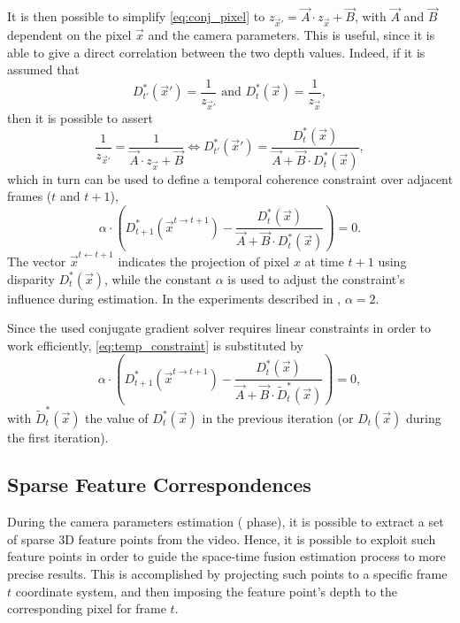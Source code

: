 {	It is then possible to simplify \cref{eq:conj_pixel} to 
	$z_{\vec x'} = \vec A\cdot z_{\vec x} + \vec B$,
	with $\vec A$ and $\vec B$ dependent on the pixel $\vec x$ and the camera parameters. This is useful, since it is able to give a direct correlation between the two depth values. 
	Indeed, if it is assumed that
	$$D^*_{t'}(\vec x') = \frac{1}{z_{\vec x'}}\text{ and }
	D^*_{t}(\vec x) = \frac{1}{z_{\vec x}},
	$$
	then it is possible to assert	
	\begin{equation*}
	\frac{1}{z_{\vec x'}} = \frac{1}{\vec A\cdot z_{\vec x} + \vec B} \iff
	D^*_{t'}(\vec x') = \frac{D^*_t(\vec x)}{\vec A + \vec B\cdot D^*_t(\vec x)},
	\end{equation*}
	which in turn can be used to define a temporal coherence constraint 
	over adjacent frames ($t$ and $t+1$), \ie
	\begin{equation}\label{eq:temp_constraint}
	\alpha \cdot \left( D^*_{t+1}(\vec x^{t\rightarrow t+1}) - \frac{D^*_t(\vec x)}{\vec A + \vec B\cdot D^*_t(\vec x)}\right) = 0.
	\end{equation}
	The vector  $\vec{x}^{t \leftarrow t+1}$ indicates the projection of pixel $x$ at time $t+1$ using disparity $D^*_{t}(\vec x)$, while the constant $\alpha$ is used to adjust the constraint's influence during estimation. In the experiments described in \cite{Zhang2009},  $	\alpha = 2$.\\

	\begin{Important}
		Since the used conjugate gradient solver requires linear constraints in order to work efficiently, \cref{eq:temp_constraint} is substituted by 
		\begin{equation*}
		\alpha \cdot\left( D^*_{t+1}(\vec x^{t\rightarrow t+1}) - \frac{D^*_t\left(\vec x\right)}{\vec A + \vec B\cdot \widetilde{D}^*_t(\vec x)}\right) = 0,
		\end{equation*}
		with $\widetilde{D}^*_t(\vec x)$ the value of ${D}^*_t(\vec x)$ in the previous iteration (or ${D}_t(\vec x)$ during the first iteration).
	\end{Important}
	
	{
	\newcommand{\ProjectedFeature}[2]{\vec{u}^{#1}_{\vec{#2}}}
	
	\subsection{Sparse Feature Correspondences}
 	During the camera parameters estimation (\SFM{} phase), it is possible to extract a set of sparse 3D feature points from the video. Hence, it is possible to exploit such feature points in order to guide the space-time fusion estimation process to more precise results. This is accomplished by projecting such points to a specific frame $t$ coordinate system, and  then imposing the feature point's depth to the corresponding pixel for frame $t$. 
 	
}}
